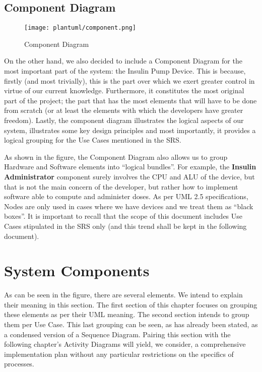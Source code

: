 \documentclass{scrreprt}
\begin{document}
\section{Component Diagram}
\begin{figure}[h!]
    \raggedright
    \texttt{[image: plantuml/component.png]}
    \caption{Component Diagram}
    \label{fig:component}
\end{figure}

\newpage
On the other hand, we also decided to include a Component Diagram for the most important part of the system: the Insulin Pump Device. This is because, firstly (and most trivially), this is the part over which we exert
greater control in virtue of our current knowledge. Furthermore, it constitutes the most original part of the project; the part that has the most elements that will have to be done from scratch (or at least the elements
with which the developers have greater freedom). Lastly, the component diagram illustrates the logical aspects of our system, illustrates some key design principles and most importantly, it provides a logical grouping 
for the Use Cases mentioned in the SRS.   

As shown in the figure, the Component Diagram also allows us to group Hardware and Software elements into “logical bundles”. For example, the \textbf{Insulin Administrator} component surely involves the CPU and ALU of 
the device, but that is not the main concern of the developer, but rather how to implement software able to compute and administer doses. As per UML 2.5 specifications, Nodes are only used in cases where we have devices 
and we treat them as “black boxes”. It is important to recall that the scope of this document includes Use Cases stipulated in the SRS only (and this trend shall be kept in the following document). 

\chapter{System Components}
As can be seen in the figure, there are several elements. We intend to explain their meaning in this section. The first section of this chapter focuses on grouping these elements as per their UML meaning. The second 
section intends to group them per Use Case. This last grouping can be seen, as has already been stated, as a condensed version of a Sequence Diagram. Pairing this section with the following chapter's Activity Diagrams 
will yield, we consider, a comprehensive implementation plan without any particular restrictions on the specifics of processes.
\end{document}
